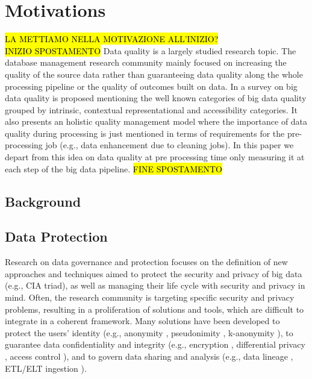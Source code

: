 \section{Motivations}
\hl{LA METTIAMO NELLA MOTIVAZIONE ALL'INIZIO?}\\
\hl{INIZIO SPOSTAMENTO}
Data quality is a largely studied research topic. The database management research community mainly focused on increasing the quality of the source data rather than guaranteeing data quality along the whole processing pipeline or the quality of outcomes built on data.
In \cite{BigDataQaulitySurvey} a survey on big data quality is proposed mentioning the well known categories of big data quality grouped by intrinsic,
contextual representational and accessibility categories.
It also presents an holistic quality management model where the importance of data quality during processing is just mentioned in terms of requirements for the pre-processing job (e.g., data enhancement due to cleaning jobs).
In this paper we depart from this idea on data quality at pre processing time only measuring it at each step of the big data pipeline.
\hl{FINE SPOSTAMENTO}

\subsection{Background}
\subsection{Data Protection}
Research on data governance and protection focuses on the definition of new approaches and techniques aimed to protect the security and privacy of big data (e.g., CIA triad), as well as managing their life cycle with security and privacy in mind. Often, the research community is targeting specific security and privacy problems, resulting in a proliferation of solutions and tools, which are difficult to integrate in a coherent framework. Many solutions have been developed to protect the users' identity (e.g., anonymity \cite{wallace1999anonymity}, pseudonimity \cite{pfitzmann2001pseudonymity}, k-anonymity \cite{k-anon}), to guarantee data confidentiality and integrity (e.g., encryption \cite{thambiraja2012survey}, differential privacy \cite{hassan2019differential}, access control \cite{tolone2005access,servos2017current}), and to govern data sharing and analysis (e.g., data lineage \cite{woodruff1997supporting}, ETL/ELT ingestion \cite{vassiliadis2009survey}).

